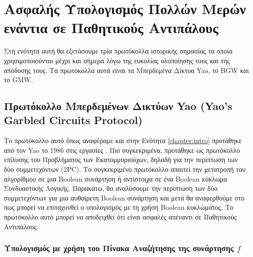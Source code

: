 \section{Ασφαλής Υπολογισμός Πολλών Μερών ενάντια σε Παθητικούς Αντιπάλους}

Στη ενότητα αυτή θα εξετάσουμε τρία πρωτόκολλα ιστορικής σημασίας τα οποία χρησιμοποιούνται μέχρι και σήμερα λόγω της ευκολίας υλοποίησης τους και της απόδοσης τους. Τα πρωτόκολλα αυτά είναι τα Μπερδεμένα Δίκτυα Yao, το BGW και το GMW.

\subsection{Πρωτόκολλο Μπερδεμένων Δικτύων Yao (Yao's Garbled Circuits Protocol)}
\label{section:yaos-gc}

Το πρωτόκολλο αυτό όπως αναφέραμε και στην Ενότητα \ref{chapter:intro} προτάθηκε από τον Yao το 1986 στις εργασίες \cite{4568207} \cite{4568388}. Πιο συγκεκριμένα, προτάθηκε ως πρωτόκολλο επίλυσης του Προβλήματος των Εκατομμυριούχων, δηλαδή για την περίπτωση των δύο συμμετεχόντων (2PC). Το συγκεκριμένο πρωτόκολλο απαιτεί την μετατροπή του αλγορίθμου σε μια Boolean συνάρτηση ή αντίστοιχα σε ένα Boolean κύκλωμα Συνδυαστικής Λογικής. Παρακάτω, θα αναλύσουμε την περίπτωση των δύο συμμετεχόντων για μια αυθαίρετη Boolean συνάρτηση και μετά θα αναφερθούμε στο πως μπορεί να επιταχυνθεί ο υπολογισμός με τη χρήση Boolean κυκλώματος. Το πρωτόκολλο αυτό μπορεί να αποδειχθεί ότι είναι ασφαλές απέναντι σε Παθητικούς Αντιπάλους.

\subsubsection{Υπολογισμός με χρήση του Πίνακα Αναζήτησης της συνάρτησης $f$}

